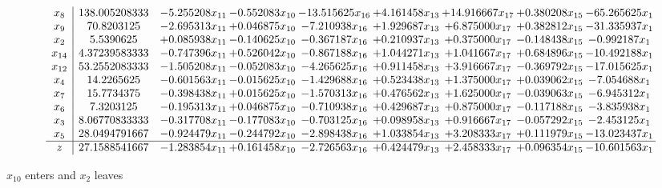 \documentclass[10pt]{article}
\begin{document}
 \[\begin{array}{c| c c@{\hskip 2pt} c@{\hskip 2pt} c@{\hskip 2pt} c@{\hskip 2pt} c@{\hskip 2pt} c@{\hskip 2pt} c@{\hskip 2pt} }
 x_{8}   &  138.005208333 & -5.255208 x_{11} & -0.552083 x_{10} & -13.515625 x_{16} & + 4.161458 x_{13} & + 14.916667 x_{17} & + 0.380208 x_{15} & -65.265625 x_{1}\\
 x_{9}   &  70.8203125 & -2.695313 x_{11} & + 0.046875 x_{10} & -7.210938 x_{16} & + 1.929687 x_{13} & + 6.875000 x_{17} & + 0.382812 x_{15} & -31.335937 x_{1}\\
 x_{2}   &  5.5390625 & + 0.085938 x_{11} & -0.140625 x_{10} & -0.367187 x_{16} & + 0.210937 x_{13} & + 0.375000 x_{17} & -0.148438 x_{15} & -0.992187 x_{1}\\
 x_{14}   &  4.37239583333 & -0.747396 x_{11} & + 0.526042 x_{10} & -0.867188 x_{16} & + 1.044271 x_{13} & + 1.041667 x_{17} & + 0.684896 x_{15} & -10.492188 x_{1}\\
 x_{12}   &  53.2552083333 & -1.505208 x_{11} & -0.052083 x_{10} & -4.265625 x_{16} & + 0.911458 x_{13} & + 3.916667 x_{17} & -0.369792 x_{15} & -17.015625 x_{1}\\
 x_{4}   &  14.2265625 & -0.601563 x_{11} & -0.015625 x_{10} & -1.429688 x_{16} & + 0.523438 x_{13} & + 1.375000 x_{17} & + 0.039062 x_{15} & -7.054688 x_{1}\\
 x_{7}   &  15.7734375 & -0.398438 x_{11} & + 0.015625 x_{10} & -1.570313 x_{16} & + 0.476562 x_{13} & + 1.625000 x_{17} & -0.039063 x_{15} & -6.945312 x_{1}\\
 x_{6}   &  7.3203125 & -0.195313 x_{11} & + 0.046875 x_{10} & -0.710938 x_{16} & + 0.429687 x_{13} & + 0.875000 x_{17} & -0.117188 x_{15} & -3.835938 x_{1}\\
 x_{3}   &  8.06770833333 & -0.317708 x_{11} & -0.177083 x_{10} & -0.703125 x_{16} & + 0.098958 x_{13} & + 0.916667 x_{17} & -0.057292 x_{15} & -2.453125 x_{1}\\
 x_{5}   &  28.0494791667 & -0.924479 x_{11} & -0.244792 x_{10} & -2.898438 x_{16} & + 1.033854 x_{13} & + 3.208333 x_{17} & + 0.111979 x_{15} & -13.023437 x_{1}\\
\hline
z    &  27.1588541667 & -1.283854 x_{11} & + 0.161458 x_{10} & -2.726563 x_{16} & + 0.424479 x_{13} & + 2.458333 x_{17} & + 0.096354 x_{15} & -10.601563 x_{1}\\
\end{array}\]


 $ x_{10} $ enters and $ x_{2} $ leaves 
\end{document}
